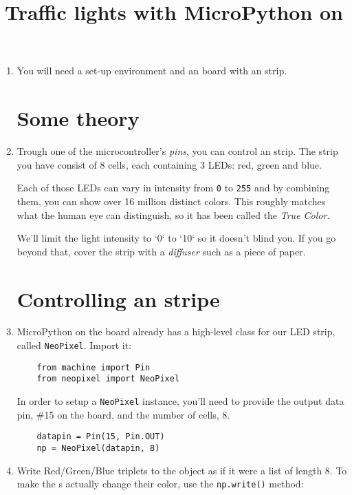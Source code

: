 \documentclass{../tutorial}
\title{Traffic lights with MicroPython on \abbr{ESP32}}
\begin{document}
\begin{enumerate}

\item
    You will need a set-up environment and an  board
    with an   strip.

\section{Some theory}

\item
    Trough one of the microcontroller's \emph{pins},
    you can control an   strip.
    The strip you have consist of 8 cells,
    each containing 3 LEDs: red, green and blue.

    Each of those LEDs can vary in intensity from \lstinline|0| to \lstinline|255|
    and by combining them, you can show over 16 million distinct colors.
    This roughly matches what the human eye can distinguish,
    so it has been called the \emph{True Color}.

    We'll limit the light intensity to `0` to `10` so it doesn't blind you.
    If you go beyond that, cover the strip with a \emph{diffuser} such as
    a piece of paper.

\section{Controlling an   stripe}

\item
    MicroPython on the  board already has a high-level class for
    our LED strip, called \lstinline|NeoPixel|. Import it:

    \begin{lstlisting}
    from machine import Pin
    from neopixel import NeoPixel
    \end{lstlisting}

    In order to setup a \lstinline|NeoPixel| instance,
    you'll need to provide the output data pin, \#15 on the board,
    and the number of cells, 8.

    \begin{lstlisting}
    datapin = Pin(15, Pin.OUT)
    np = NeoPixel(datapin, 8)
    \end{lstlisting}

\item
    Write Red/Green/Blue triplets to the object as if it were a list of length 8.
    To make the s actually change their color,
    use the \lstinline|np.write()| method:


\end{enumerate}
\end{document}
